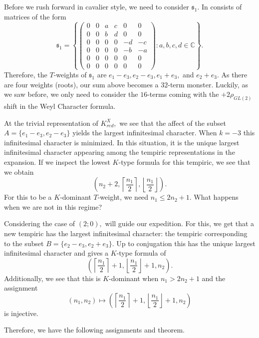 \documentclass[letterpaper,twosided,11pt]{article}
\theoremstyle{plain}
\theoremstyle{definition}
\theoremstyle{remark}
\newcommand{\C}{\mathbb{C}}
\newcommand{\Mat}[1]{\begin{pmatrix}#1\end{pmatrix}}
\newcommand{\lie}[1]{\mathfrak{#1}}
\begin{document}
Before we rush forward in cavalier style, we need to consider $ \lie{s}_1.
$ In consists of matrices of the form
\[
    \lie{s}_1=\left \{ \Mat{ 0 &0 & a & c & 0 & 0\\
    0 & 0 & b & d & 0 & 0\\
    0 & 0 & 0 &0 & -d & -c \\
    0 & 0 & 0&0&-b&-a\\
    0&0&0&0&0&0 \\
    0&0&0&0&0&0}:  a,b,c,d\in \C \right\}.
\]
Therefore, the $ T $-weights of $ \lie{s}_1 $ are $ e_1-e_3,e_2-e_3,e_1+e_3,
$ and $ e_2+e_3. $ As there are four weights (roots), our sum above
becomes a $ 32 $-term monster.  Luckily, as we saw before, we only need
to consider the $ 16 $-terms coming with the $ +2\rho_{GL(2)} $ shift in
the Weyl Character formula.

At the trivial representation of $ K^X_{red}, $ we see that the affect
of the subset $ A=\{e_1-e_3,e_2-e_3\} $ yields the largest infinitesimal
character.  When $ k=-3 $ this infinitesimal character is minimized.  In
this situation, it is the unique largest infinitesimal character
appearing among the tempiric representations in the expansion.  If we
inspect the lowest $ K $-type formula for this tempiric, we see that we
obtain
\[
    \left(n_2+2, \left\lceil \frac{n_1}{2} \right \rceil, \left\lfloor
    \frac{n_1}{2} \right \rfloor\right).
\]
For this to be a $ K $-dominant $ T $-weight, we need $ n_1\leq 2n_2+1. $
What happens when we are not in this regime?

Considering the case of $ (2;0), $ will guide our expedition.  For this,
we get that a new tempiric has the largest infinitesimal character:  the
tempiric corresponding to the subset $ B=\{e_2-e_3,e_2+e_3\}. $ Up to
conjugation this has the unique largest infinitesimal character and
gives a $ K $-type formula of
\[
    \left( \left\lceil \frac{n_1}{2} \right \rceil+1, \left\lfloor \frac
    {n_1}{2} \right \rfloor+1,n_2\right).
\]
Additionally, we see that this is $ K $-dominant when $ n_1>2n_2+1$
and the assignment \[ (n_1,n_2)\mapsto \left( \left\lceil \frac{n_1}{2} \right \rceil+1, \left\lfloor \frac
    {n_1}{2} \right \rfloor+1,n_2\right)\]
    is injective. 

Therefore, we have the following assignments and theorem.
\end{document}
